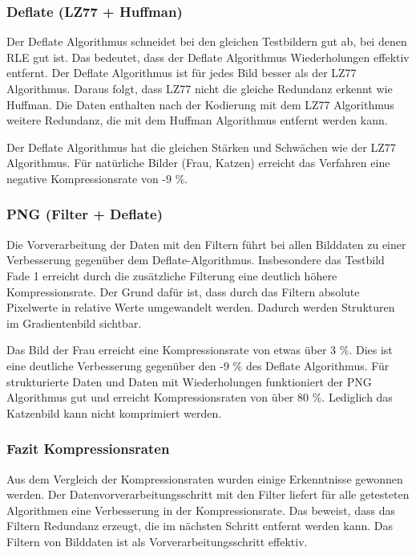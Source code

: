 \documentclass[conference]{IEEEtran}
\begin{document}
\subsubsection{Deflate (LZ77 + Huffman)}

Der Deflate Algorithmus schneidet bei den gleichen Testbildern gut ab, bei
denen RLE gut ist.
Das bedeutet, dass der Deflate Algorithmus Wiederholungen effektiv entfernt.
Der Deflate Algorithmus ist für jedes Bild besser als der LZ77 Algorithmus.
Daraus folgt, dass LZ77 nicht die gleiche Redundanz erkennt wie Huffman.
Die Daten enthalten nach der Kodierung mit dem LZ77 Algorithmus weitere
Redundanz, die mit dem Huffman Algorithmus entfernt werden kann.

Der Deflate Algorithmus hat die gleichen Stärken und Schwächen wie der LZ77 Algorithmus.
Für natürliche Bilder (Frau, Katzen) erreicht das Verfahren eine negative
Kompressionsrate von -9 \%.

\subsubsection{PNG (Filter + Deflate)}

Die Vorverarbeitung der Daten mit den Filtern führt bei allen Bilddaten zu einer
Verbesserung gegenüber dem Deflate-Algorithmus.
Insbesondere das Testbild Fade 1 erreicht durch die zusätzliche Filterung
eine deutlich höhere Kompressionsrate.
Der Grund dafür ist, dass durch das Filtern absolute Pixelwerte in relative Werte
umgewandelt werden.
Dadurch werden Strukturen im Gradientenbild sichtbar.

Das Bild der Frau erreicht eine Kompressionsrate von etwas über 3 \%.
Dies ist eine deutliche Verbesserung gegenüber den -9 \% des Deflate Algorithmus.
Für strukturierte Daten und Daten mit Wiederholungen funktioniert der
PNG Algorithmus gut und erreicht Kompressionsraten von über 80 \%.
Lediglich das Katzenbild kann nicht komprimiert werden.


\subsubsection{Fazit Kompressionsraten}

Aus dem Vergleich der Kompressionsraten wurden einige Erkenntnisse gewonnen werden.
Der Datenvorverarbeitungsschritt mit den Filter liefert für alle getesteten
Algorithmen eine Verbesserung in der Kompressionsrate.
Das beweist, dass das Filtern Redundanz erzeugt, die im nächsten Schritt
entfernt werden kann.
Das Filtern von Bilddaten ist als Vorverarbeitungsschritt effektiv.
\end{document}
